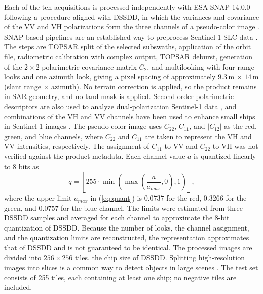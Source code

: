 \documentclass[conference]{IEEEtran}
\begin{document}
Each of the ten acquisitions is processed independently with ESA SNAP 14.0.0 following a procedure aligned with DSSDD, in which the variances and covariance of the VV and VH polarizations form the three channels of a pseudo-color image \cite{hu2021dssdd}. SNAP-based pipelines are an established way to preprocess Sentinel-1 SLC data \cite{weiss2022sensarp}. The steps are TOPSAR split of the selected subswaths, application of the orbit file, radiometric calibration with complex output, TOPSAR deburst, generation of the $2 \times 2$ polarimetric covariance matrix $C_2$, and multilooking with four range looks and one azimuth look, giving a pixel spacing of approximately $9.3$\,m $\times$ $14$\,m (slant range $\times$ azimuth). No terrain correction is applied, so the product remains in SAR geometry, and no land mask is applied. Second-order polarimetric descriptors are also used to analyze dual-polarization Sentinel-1 data \cite{mascolo2022}, and combinations of the VH and VV channels have been used to enhance small ships in Sentinel-1 images \cite{shin2024,shin2025}. The pseudo-color image uses $C_{22}$, $C_{11}$, and $|C_{12}|$ as the red, green, and blue channels, where $C_{22}$ and $C_{11}$ are taken to represent the VH and VV intensities, respectively. The assignment of $C_{11}$ to VV and $C_{22}$ to VH was not verified against the product metadata. Each channel value $a$ is quantized linearly to 8 bits as
\begin{equation}
	q = \left\lfloor 255 \cdot \min\!\left( \max\!\left( \frac{a}{a_{max}}, 0 \right), 1 \right) \right\rfloor,
	\label{eq:quant}
\end{equation}
where the upper limit $a_{max}$ in (\ref{eq:quant}) is $0.0737$ for the red, $0.3266$ for the green, and $0.0757$ for the blue channel. The limits were estimated from three DSSDD samples and averaged for each channel to approximate the 8-bit quantization of DSSDD. Because the number of looks, the channel assignment, and the quantization limits are reconstructed, the representation approximates that of DSSDD and is not guaranteed to be identical. The processed images are divided into $256 \times 256$ tiles, the chip size of DSSDD. Splitting high-resolution images into slices is a common way to detect objects in large scenes \cite{ge2024}. The test set consists of 255 tiles, each containing at least one ship; no negative tiles are included.
\end{document}
